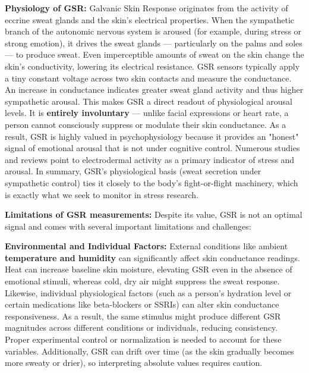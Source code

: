 \textbf{Physiology of GSR:} Galvanic Skin Response originates from the activity of eccrine sweat glands and the skin's electrical properties. When the sympathetic branch of the autonomic nervous system is aroused (for example, during stress or strong emotion), it drives the sweat glands — particularly on the palms and soles — to produce sweat\cite{ElectrodermalActivityWiki}. Even imperceptible amounts of sweat on the skin change the skin's conductivity, lowering its electrical resistance. GSR sensors typically apply a tiny constant voltage across two skin contacts and measure the conductance. An increase in conductance indicates greater sweat gland activity and thus higher sympathetic arousal\cite{GSRGuideIMotions}. This makes GSR a direct readout of physiological arousal levels. It is \textbf{entirely involuntary} — unlike facial expressions or heart rate, a person cannot consciously suppress or modulate their skin conductance. As a result, GSR is highly valued in psychophysiology because it provides an "honest" signal of emotional arousal that is not under cognitive control. Numerous studies and reviews point to electrodermal activity as a primary indicator of stress and arousal\cite{GSRPPGMachineLearning2024}. In summary, GSR's physiological basis (sweat secretion under sympathetic control) ties it closely to the body's fight-or-flight machinery, which is exactly what we seek to monitor in stress research.

\textbf{Limitations of GSR measurements:} Despite its value, GSR is not an optimal signal and comes with several important limitations and challenges\cite{ElectrodermalActivityWiki}:

\textbf{Environmental and Individual Factors:} External conditions like ambient \textbf{temperature and humidity} can significantly affect skin conductance readings\cite{ElectrodermalActivityWiki}. Heat can increase baseline skin moisture, elevating GSR even in the absence of emotional stimuli, whereas cold, dry air might suppress the sweat response. Likewise, individual physiological factors (such as a person's hydration level or certain medications like beta-blockers or SSRIs) can alter skin conductance responsiveness\cite{ElectrodermalActivityWiki}. As a result, the same stimulus might produce different GSR magnitudes across different conditions or individuals, reducing consistency. Proper experimental control or normalization is needed to account for these variables. Additionally, GSR can drift over time (as the skin gradually becomes more sweaty or drier), so interpreting absolute values requires caution.

